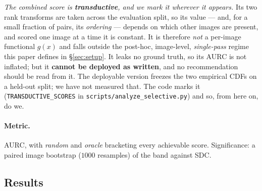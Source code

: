 \documentclass[11pt]{article}
\theoremstyle{remark}
\begin{document}
\emph{The combined score is \textbf{transductive}, and we mark it wherever it appears.}
Its two rank transforms are taken across the evaluation split, so its value --- and, for
a small fraction of pairs, its \emph{ordering} --- depends on which other images are
present, and scored one image at a time it is constant. It is therefore \emph{not} a
per-image functional $g(x)$ and falls outside the post-hoc, image-level,
\emph{single-pass} regime this paper defines in \S\ref{sec:setup}. It leaks no ground
truth, so its AURC is not inflated; but it \textbf{cannot be deployed as written}, and
no recommendation should be read from it. The deployable version freezes the two
empirical CDFs on a held-out split; we have not measured that. The code marks it
(\texttt{TRANSDUCTIVE\_SCORES} in \texttt{scripts/analyze\_selective.py}) and so, from
here on, do we.

\paragraph{Metric.} AURC, with \emph{random} and \emph{oracle} bracketing every
achievable score. Significance: a paired image bootstrap ($1000$ resamples) of the
band against SDC.

\subsection{Results}\label{sec:results}
\end{document}
